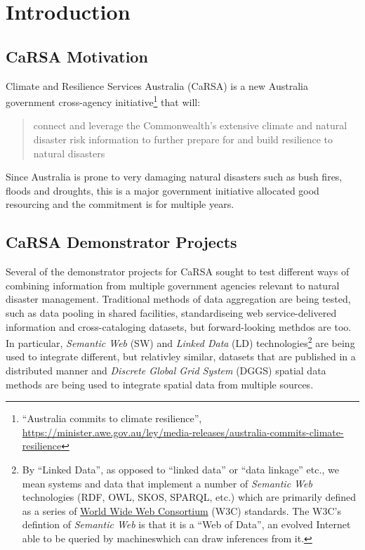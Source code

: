 \documentclass[runningheads]{llncs}
\begin{document}
\section{Introduction}\label{sec:introduction}
\subsection{CaRSA Motivation}
Climate and Resilience Services Australia (CaRSA) is a new Australia government cross-agency initiative\footnote{``Australia commits to climate resilience'', \url{https://minister.awe.gov.au/ley/media-releases/australia-commits-climate-resilience}}
that will:

\begin{quote}
    connect and leverage the Commonwealth’s extensive climate and natural disaster risk information to further prepare for and build 
    resilience to natural disasters
\end{quote}

Since Australia is prone to very damaging natural disasters such as bush fires, floods and droughts, this is a major government initiative
allocated good resourcing and the commitment is for multiple years.

\subsection{CaRSA Demonstrator Projects}
Several of the demonstrator projects for CaRSA sought to test different ways of combining information from multiple government agencies 
relevant to natural disaster management. Traditional methods of data aggregation are being tested, such as data pooling in shared facilities,
standardiseing web service-delivered information and cross-cataloging datasets, but forward-looking methdos are too. In particular,
\textit{Semantic Web} (SW) and \textit{Linked Data} (LD) technologies\footnote{By ``Linked Data'', as opposed to ``linked data'' or ``data linkage'' etc.,
we mean systems and data that implement a number of \textit{Semantic Web} technologies (RDF, OWL, SKOS, SPARQL, etc.) which are primarily 
defined as a series of \href{https://www.w3.org/standards/semanticweb/data}{World Wide Web Consortium} (W3C) standards. The W3C's defintion of 
\textit{Semantic Web} is that it is a ``Web of Data'', an evolved Internet able to be queried by machineswhich can draw inferences from it.}
are being used to integrate different, but relativley similar, datasets that are published in a distributed manner and
\textit{Discrete Global Grid System} (DGGS) spatial data methods are being used to integrate spatial data from multiple sources.
\end{document}
